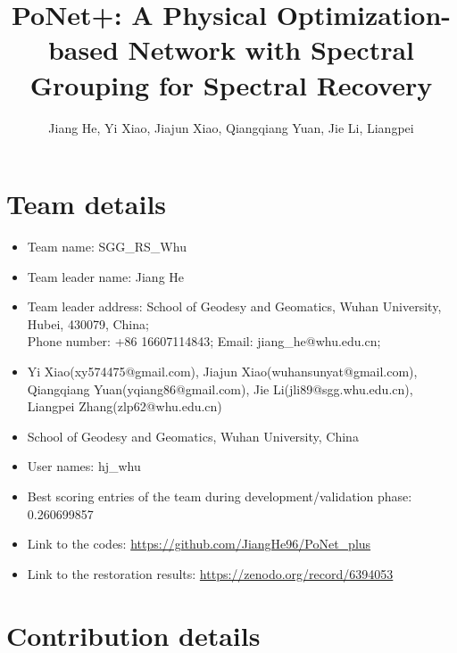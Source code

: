 \documentclass{article}
\title{PoNet+: A Physical Optimization-based Network with Spectral Grouping for Spectral Recovery}
\author{Jiang He, Yi Xiao, Jiajun Xiao, Qiangqiang Yuan, Jie Li, Liangpei}
\begin{document}
\maketitle

\section{Team details}

\begin{itemize}
\item Team name: SGG\_RS\_Whu                                  
\item Team leader name: Jiang He                           
\item Team leader address: School of Geodesy and Geomatics, Wuhan University, Hubei, 430079, China;  \\Phone number: +86 16607114843; Email: jiang\_he@whu.edu.cn; 
\item Yi Xiao(xy574475@gmail.com), Jiajun Xiao(wuhansunyat@gmail.com),\\Qiangqiang Yuan(yqiang86@gmail.com), Jie Li(jli89@sgg.whu.edu.cn), \\Liangpei Zhang(zlp62@whu.edu.cn)
\item School of Geodesy and Geomatics, Wuhan University, China
\item User names: hj\_whu 
\item Best scoring entries of the team during development/validation phase: 0.260699857
\item Link to the codes: \href{https://github.com/JiangHe96/PoNet_plus}{https://github.com/JiangHe96/PoNet\_plus}
\item Link to the restoration results: \href{https://zenodo.org/record/6394053}{https://zenodo.org/record/6394053}
\end{itemize}

\section{Contribution details}
\end{document}
